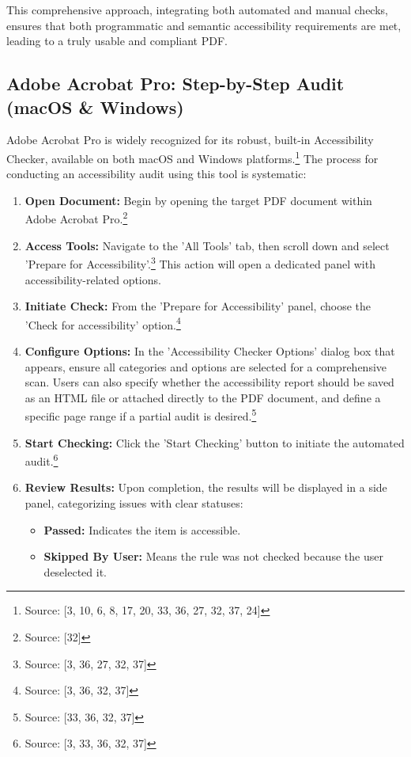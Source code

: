 This comprehensive approach, integrating both automated and manual checks, ensures that both programmatic and semantic accessibility requirements are met, leading to a truly usable and compliant PDF.

\subsection{Adobe Acrobat Pro: Step-by-Step Audit (macOS \& Windows)}

Adobe Acrobat Pro is widely recognized for its robust, built-in Accessibility Checker, available on both macOS and Windows platforms.\footnote{Source: [3, 10, 6, 8, 17, 20, 33, 36, 27, 32, 37, 24]} The process for conducting an accessibility audit using this tool is systematic:

\begin{enumerate}[noitemsep,topsep=0pt]
    \item \textbf{Open Document:} Begin by opening the target PDF document within Adobe Acrobat Pro.\footnote{Source: [32]}
    \item \textbf{Access Tools:} Navigate to the 'All Tools' tab, then scroll down and select 'Prepare for Accessibility'.\footnote{Source: [3, 36, 27, 32, 37]} This action will open a dedicated panel with accessibility-related options.
    \item \textbf{Initiate Check:} From the 'Prepare for Accessibility' panel, choose the 'Check for accessibility' option.\footnote{Source: [3, 36, 32, 37]}
    \item \textbf{Configure Options:} In the 'Accessibility Checker Options' dialog box that appears, ensure all categories and options are selected for a comprehensive scan. Users can also specify whether the accessibility report should be saved as an HTML file or attached directly to the PDF document, and define a specific page range if a partial audit is desired.\footnote{Source: [33, 36, 32, 37]}
    \item \textbf{Start Checking:} Click the 'Start Checking' button to initiate the automated audit.\footnote{Source: [3, 33, 36, 32, 37]}
    \item \textbf{Review Results:} Upon completion, the results will be displayed in a side panel, categorizing issues with clear statuses:
    \begin{itemize}[noitemsep,topsep=0pt]
        \item \textbf{Passed:} Indicates the item is accessible.
        \item \textbf{Skipped By User:} Means the rule was not checked because the user deselected it.

\end{itemize}
\end{enumerate}
